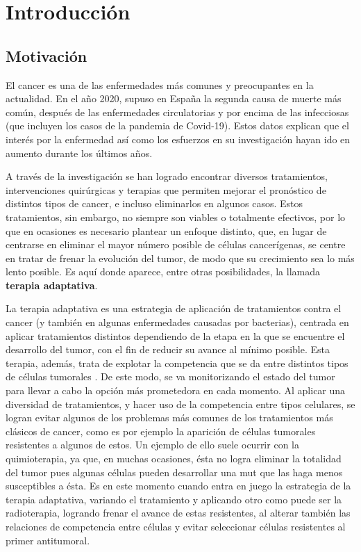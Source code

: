 \chapter{Introducción}\label{1}

\section{Motivación}\label{1.1}

El \gls{cancer}\cite{Cancer} es una de las enfermedades más comunes y preocupantes en la actualidad. En el año 2020, supuso en España la segunda causa de muerte más común, después de las enfermedades circulatorias y por encima de las infecciosas (que incluyen los casos de la pandemia de Covid-19)\cite{Deaths}. Estos datos explican que el interés por la enfermedad así como los esfuerzos en su investigación hayan ido en aumento durante los últimos años.

A través de la investigación se han logrado encontrar diversos tratamientos, intervenciones quirúrgicas y terapias que permiten mejorar el pronóstico de distintos tipos de \gls{cancer}, e incluso eliminarlos en algunos casos. Estos tratamientos, sin embargo, no siempre son viables o totalmente efectivos, por lo que en ocasiones es necesario plantear un enfoque distinto, que, en lugar de centrarse en eliminar el mayor número posible de células cancerígenas, se centre en tratar de frenar la evolución del \gls{tumor}, de modo que su crecimiento sea lo más lento posible. Es aquí donde aparece, entre otras posibilidades, la llamada \textbf{terapia adaptativa}\cite{AdaptiveTherapy}\cite{Hansen1}.

La terapia adaptativa es una estrategia de aplicación de tratamientos contra el \gls{cancer} (y también en algunas enfermedades causadas por bacterias), centrada en aplicar tratamientos distintos dependiendo de la etapa en la que se encuentre el desarrollo del \gls{tumor}, con el fin de reducir su avance al mínimo posible. Esta terapia, además, trata de explotar la competencia que se da entre distintos tipos de células tumorales \cite{Hansen1}\cite{Hansen2}. De este modo, se va monitorizando el estado del \gls{tumor} para llevar a cabo la opción más prometedora en cada momento. Al aplicar una diversidad de tratamientos, y hacer uso de la competencia entre tipos celulares, se logran evitar algunos de los problemas más comunes de los tratamientos más clásicos de \gls{cancer}, como es por ejemplo la aparición de células tumorales resistentes a algunos de estos. Un ejemplo de ello suele ocurrir con la quimioterapia, ya que, en muchas ocasiones, ésta no logra eliminar la totalidad del \gls{tumor} pues algunas células pueden desarrollar una \gls{mut} que las haga menos susceptibles a ésta. Es en este momento cuando entra en juego la estrategia de la terapia adaptativa, variando el tratamiento y aplicando otro como puede ser la radioterapia, logrando frenar el avance de estas resistentes, al alterar también las relaciones de competencia entre células y evitar seleccionar células resistentes al primer antitumoral.

